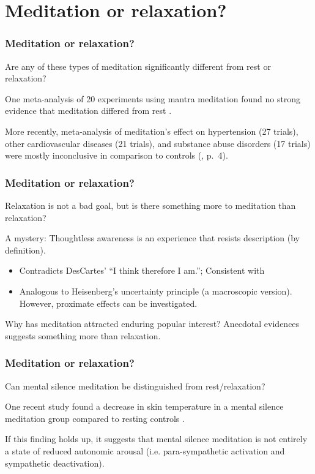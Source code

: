 \documentclass[10pt,utf8x]{beamer}
\begin{document}
\section{Meditation or relaxation?}
\begin{frame}
\frametitle{Meditation or relaxation?}

Are any of these types of meditation significantly different from
rest or relaxation?

\medskip
One meta-analysis of 20 experiments using mantra meditation found
no strong evidence that meditation differed from rest \cite{holmes1984}.

\medskip
More recently, meta-analysis of meditation's effect on
hypertension (27 trials), other cardiovascular diseases (21 trials),
and substance abuse disorders (17 trials) were mostly inconclusive
in comparison to controls (, p.~4).
\end{frame}

\begin{frame}
\frametitle{Meditation or relaxation?}

Relaxation is not a bad goal, but is there something more to
meditation than relaxation?

\medskip
A mystery: Thoughtless awareness is an experience that
resists description (by definition).

\begin{itemize}
\item Contradicts DesCartes' ``I think therefore I am.'';
Consistent with 
\item Analogous to Heisenberg's uncertainty principle
(a macroscopic version). However, proximate effects can be investigated.
\end{itemize}

\medskip
Why has meditation attracted enduring popular interest?
Anecdotal evidences suggests something more than relaxation.

\end{frame}

\begin{frame}
\frametitle{Meditation or relaxation?}

Can mental silence meditation be distinguished from
rest/relaxation?

\medskip
One recent study found a decrease in skin temperature
in a mental silence meditation group compared to resting controls
\cite{manocha2010}.

\medskip
If this finding holds up, it suggests that mental silence meditation
is not entirely a state of reduced autonomic arousal
(i.e. para-sympathetic activation and sympathetic deactivation).
\end{frame}
\end{document}
